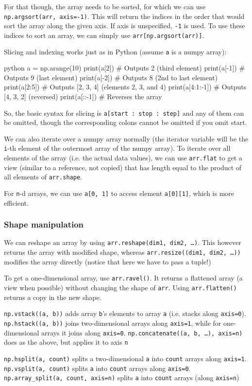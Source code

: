 For that though, the array needs to be sorted, for which we can use \texttt{np.argsort(arr, axis=-1)}.
This will return the indices in the order that would sort the array along the given axis. If axis is unspecified, \texttt{-1} is used.
To use these indices to sort an array, we can simply use \texttt{arr[np.argsort(arr)]}.


Slicing and indexing works just as in Python (assume \texttt{a} is a numpy array):
\begin{code}{python}
    a = np.arange(10)
    print(a[2]) # Outputs 2 (third element)
    print(a[-1]) # Outputs 9 (last element)
    print(a[-2]) # Outputs 8 (2nd to last element)
    print(a[2:5]) # Outputs [2, 3, 4] (elements 2, 3, and 4)
    print(a[4:1:-1]) # Outputs [4, 3, 2] (reversed)
    print(a[::-1]) # Reverses the array
\end{code}
So, the basic syntax for slicing is \texttt{a[start : stop : step]} and any of them can be omitted, though the corresponding colons cannot be omitted if you omit start.

We can also iterate over a numpy array normally (the iterator variable will be the \texttt{i}-th element of the outermost array of the numpy array).
To iterate over all elements of the array (i.e. the actual data values), we can use \texttt{arr.flat} to get a view (similar to a reference, not copied) that has
length equal to the product of all elements of \texttt{arr.shape}.

For \texttt{n}-d arrays, we can use \texttt{a[0, 1]} to access element \texttt{a[0][1]}, which is more efficient.


\subsubsection{Shape manipulation}
We can reshape an array by using \texttt{arr.reshape(dim1, dim2, \dots)}. This however returns the array with modified shape,
whereas \texttt{arr.resize((dim1, dim2, \dots))} modifies the array directly (notice that here we have to pass a tuple!)

To get a one-dimensional array, use \texttt{arr.ravel()}. It returns a flattened array (a view when possible) without changing the shape of \texttt{arr}.
Using \texttt{arr.flatten()} returns a copy in the new shape.



\texttt{np.vstack((a, b))} adds array \texttt{b}'s elements to array \texttt{a} (i.e. stacks along \texttt{axis=0}).
\texttt{np.hstack((a, b))} joins two-dimensional arrays along \texttt{axis=1}, while for one-dimensional arrays it joins along \texttt{axis=0}.
\texttt{np.concatenate((a, b, \dots), axis=n)} does as the above, but applies it to axis \texttt{n}


\texttt{np.hsplit(a, count)} splits a two-dimensional \texttt{a} into \texttt{count} arrays along \texttt{axis=1}.
\texttt{np.vsplit(a, count)} splits \texttt{a} into \texttt{count} arrays along \texttt{axis=0}.
\texttt{np.array\_split(a, count, axis=n)} splits \texttt{a} into \texttt{count} arrays (along \texttt{axis=n})
